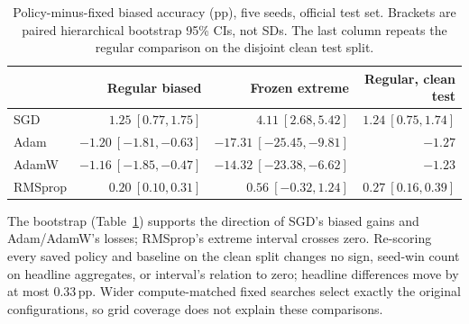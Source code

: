 \documentclass{article}
\newcommand{\pp}{\ensuremath{\,\mathrm{pp}}}
\begin{document}
\begin{table}[t]
\centering\footnotesize
\caption{Policy-minus-fixed biased accuracy (pp), five seeds, official test set. Brackets are paired hierarchical bootstrap 95\% CIs, not SDs. The last column repeats the regular comparison on the disjoint clean test split.}
\label{tab:ci}
\setlength{\tabcolsep}{4pt}
\begin{tabular}{lrrr}
\toprule
&Regular biased&Frozen extreme&Regular, clean test\\
\midrule
SGD&$1.25\ [0.77,1.75]$&$4.11\ [2.68,5.42]$&$1.24\ [0.75,1.74]$\\
Adam&$-1.20\ [-1.81,-0.63]$&$-17.31\ [-25.45,-9.81]$&$-1.27$\\
AdamW&$-1.16\ [-1.85,-0.47]$&$-14.32\ [-23.38,-6.62]$&$-1.23$\\
RMSprop&$0.20\ [0.10,0.31]$&$0.56\ [-0.32,1.24]$&$0.27\ [0.16,0.39]$\\
\bottomrule
\end{tabular}
\end{table}
The bootstrap (Table~\ref{tab:ci}) supports the direction of SGD's biased gains and Adam/AdamW's losses; RMSprop's extreme interval crosses zero. Re-scoring every saved policy and baseline on the clean split changes no sign, seed-win count on headline aggregates, or interval's relation to zero; headline differences move by at most 0.33\pp. Wider compute-matched fixed searches select exactly the original configurations, so grid coverage does not explain these comparisons.
\end{document}
